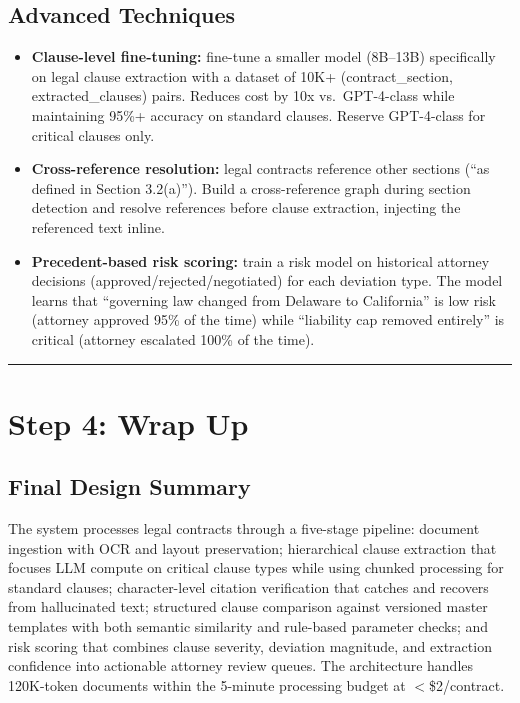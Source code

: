 \subsection*{Advanced Techniques}

\begin{itemize}
  \item \textbf{Clause-level fine-tuning:} fine-tune a smaller model (8B--13B) specifically on legal clause extraction with a dataset of 10K+ (contract\_section, extracted\_clauses) pairs. Reduces cost by 10x vs.\ GPT-4-class while maintaining 95\%+ accuracy on standard clauses. Reserve GPT-4-class for critical clauses only.
  \item \textbf{Cross-reference resolution:} legal contracts reference other sections (``as defined in Section 3.2(a)''). Build a cross-reference graph during section detection and resolve references before clause extraction, injecting the referenced text inline.
  \item \textbf{Precedent-based risk scoring:} train a risk model on historical attorney decisions (approved/rejected/negotiated) for each deviation type. The model learns that ``governing law changed from Delaware to California'' is low risk (attorney approved 95\% of the time) while ``liability cap removed entirely'' is critical (attorney escalated 100\% of the time).
\end{itemize}

\bigskip\hrule\bigskip

\section*{Step 4: Wrap Up}

\subsection*{Final Design Summary}

The system processes legal contracts through a five-stage pipeline: document ingestion with OCR and layout preservation; hierarchical clause extraction that focuses LLM compute on critical clause types while using chunked processing for standard clauses; character-level citation verification that catches and recovers from hallucinated text; structured clause comparison against versioned master templates with both semantic similarity and rule-based parameter checks; and risk scoring that combines clause severity, deviation magnitude, and extraction confidence into actionable attorney review queues. The architecture handles 120K-token documents within the 5-minute processing budget at $<$\$2/contract.

